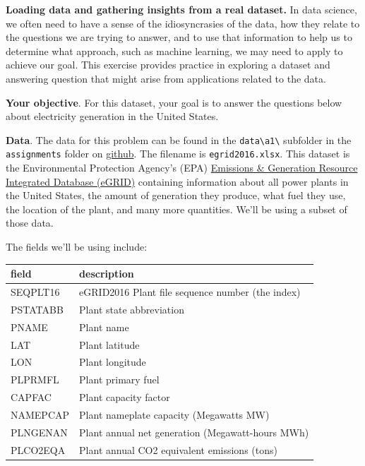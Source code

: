 \documentclass[
  letterpaper,
  DIV=11,
  numbers=noendperiod]{scrartcl}
\begin{document}
\textbf{Loading data and gathering insights from a real dataset.} In
data science, we often need to have a sense of the idiosyncrasies of the
data, how they relate to the questions we are trying to answer, and to
use that information to help us to determine what approach, such as
machine learning, we may need to apply to achieve our goal. This
exercise provides practice in exploring a dataset and answering question
that might arise from applications related to the data.

\textbf{Your objective}. For this dataset, your goal is to answer the
questions below about electricity generation in the United States.

\textbf{Data}. The data for this problem can be found in the
\texttt{data\textbackslash{}a1\textbackslash{}} subfolder in the
\texttt{assignments} folder on
\href{https://github.com/kylebradbury/ids705}{github}. The filename is
\texttt{egrid2016.xlsx}. This dataset is the Environmental Protection
Agency's (EPA)
\href{https://www.epa.gov/energy/emissions-generation-resource-integrated-database-egrid}{Emissions
\& Generation Resource Integrated Database (eGRID)} containing
information about all power plants in the United States, the amount of
generation they produce, what fuel they use, the location of the plant,
and many more quantities. We'll be using a subset of those data.

The fields we'll be using include:

\begin{longtable}[]{@{}ll@{}}
\toprule\noalign{}
field & description \\
\midrule\noalign{}
\endhead
\bottomrule\noalign{}
\endlastfoot
SEQPLT16 & eGRID2016 Plant file sequence number (the index) \\
PSTATABB & Plant state abbreviation \\
PNAME & Plant name \\
LAT & Plant latitude \\
LON & Plant longitude \\
PLPRMFL & Plant primary fuel \\
CAPFAC & Plant capacity factor \\
NAMEPCAP & Plant nameplate capacity (Megawatts MW) \\
PLNGENAN & Plant annual net generation (Megawatt-hours MWh) \\
PLCO2EQA & Plant annual CO2 equivalent emissions (tons) \\
\end{longtable}
\end{document}
